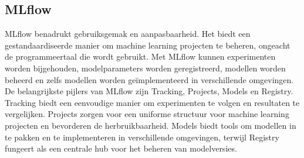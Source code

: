 \subsection{MLflow}
MLflow benadrukt gebruiksgemak en aanpasbaarheid. Het biedt een gestandaardiseerde manier om machine learning projecten te beheren, ongeacht de programmeertaal die wordt gebruikt. Met MLflow kunnen experimenten worden bijgehouden, modelparameters worden geregistreerd, modellen worden beheerd en zelfs modellen worden geïmplementeerd in verschillende omgevingen.
De belangrijkste pijlers van MLflow zijn Tracking, Projects, Models en Registry. Tracking biedt een eenvoudige manier om experimenten te volgen en resultaten te vergelijken. Projects zorgen voor een uniforme structuur voor machine learning projecten en bevorderen de herbruikbaarheid. Models biedt tools om modellen in te pakken en te implementeren in verschillende omgevingen, terwijl Registry fungeert als een centrale hub voor het beheren van modelversies.






